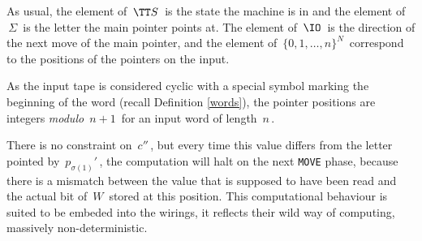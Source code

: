 
As usual, the element of $\,\TT S\,$ is the state the machine is in and the element of $\,\Sigma\,$ is the letter the main pointer points at.
The element of $\,\IO\,$ is the direction of the next move of the main pointer, and the element of $\,\{0,1,\dots,n\}^N\,$ correspond to the positions of the pointers on the input.

\smallskip

As the input tape is considered cyclic with a special symbol marking the beginning of the word (recall Definition \ref{words}), the pointer positions are integers \emph{modulo} $\,n+1\,$ for an input word of length $\,n\,$.

There is no constraint on $\,c''\,$, but every time this value differs from the letter pointed by $\,p_{\sigma(1)}'\,$, the computation will halt on the next \texttt{MOVE} phase, because there is a mismatch between the value that is supposed to have been read and the actual bit of $\,W\,$ stored at this position.
This computational behaviour is suited to be embeded into the wirings, it reflects their wild way of computing, massively non-deterministic.

